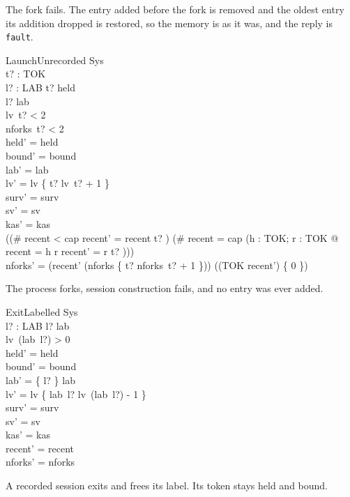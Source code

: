 \documentclass[a4paper,10pt,fleqn]{article}
\begin{document}
The fork fails. The entry added before the fork is removed and the oldest entry its addition dropped is restored, so the memory is as it was, and the reply is \texttt{fault}.

\begin{schema}{LaunchUnrecorded}
  \Delta Sys \\
  t? : TOK \\ l? : LAB
\where
  t? \notin \dom held \\
  l? \notin \dom lab \\
  lv~t? < 2 \\
  nforks~t? < 2 \\
  held' = held \\
  bound' = bound \\
  lab' = lab \\
  lv' = lv \oplus \{ t? \mapsto lv~t? + 1 \} \\
  surv' = surv \\
  sv' = sv \\
  kas' = kas \\
  ((\# recent < cap \land recent' = recent \cat \langle t? \rangle) \lor (\# recent = cap \land (\exists h : TOK; r : \seq TOK @ recent = \langle h \rangle \cat r \land recent' = r \cat \langle t? \rangle))) \\
  nforks' = (\ran recent' \dres (nforks \oplus \{ t? \mapsto nforks~t? + 1 \})) \cup ((TOK \setminus \ran recent') \cross \{ 0 \})
\end{schema}

The process forks, session construction fails, and no entry was ever added.

\begin{schema}{ExitLabelled}
  \Delta Sys \\
  l? : LAB
\where
  l? \in \dom lab \\
  lv~(lab~l?) > 0 \\
  held' = held \\
  bound' = bound \\
  lab' = \{ l? \} \ndres lab \\
  lv' = lv \oplus \{ lab~l? \mapsto lv~(lab~l?) - 1 \} \\
  surv' = surv \\
  sv' = sv \\
  kas' = kas \\
  recent' = recent \\
  nforks' = nforks
\end{schema}

A recorded session exits and frees its label. Its token stays held and bound.
\end{document}
